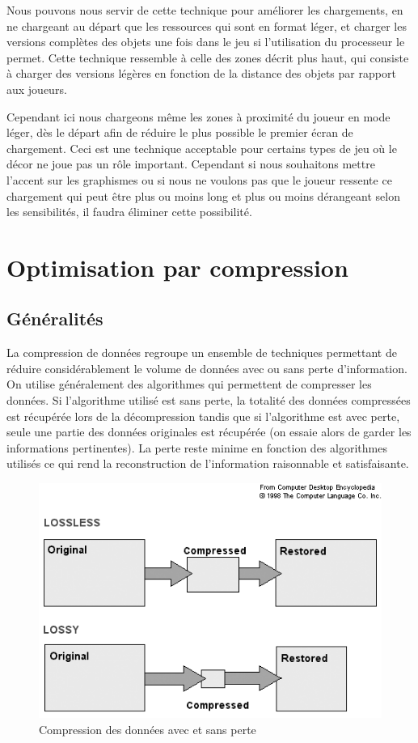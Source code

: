 \documentclass[a4paper, 11pt]{article} %
\begin{document}
Nous pouvons nous servir de cette technique pour améliorer les chargements, en ne chargeant au départ que les ressources qui sont en format léger, et charger les versions complètes des objets une fois dans le jeu si l'utilisation du processeur le permet. Cette technique ressemble à celle des zones décrit plus haut, qui consiste à charger des versions légères en fonction de la distance des objets par rapport aux joueurs.

Cependant ici nous chargeons même les zones à proximité du joueur en mode léger, dès le départ afin de réduire le plus possible le premier écran de chargement. Ceci est une technique acceptable pour certains types de jeu où le décor ne joue pas un rôle important. Cependant si nous souhaitons mettre l'accent sur les graphismes ou si nous ne voulons pas que le joueur ressente ce chargement qui peut être plus ou moins long et plus ou moins dérangeant selon les sensibilités, il faudra éliminer cette possibilité.

\newpage
\section{Optimisation par compression}
\subsection{Généralités}
La compression de données regroupe un ensemble de techniques permettant de réduire considérablement le volume de données avec ou sans perte d'information. On utilise généralement des algorithmes qui permettent de compresser les données. Si l'algorithme utilisé est sans perte, la totalité des données compressées est récupérée lors de la décompression tandis que si l'algorithme est avec perte, seule une partie des données originales est récupérée (on essaie alors de garder les informations pertinentes). La perte reste minime en fonction des algorithmes utilisés ce qui rend la reconstruction de l'information raisonnable et satisfaisante. 

\begin{figure}[!h]%
\includegraphics[width=\columnwidth]{images/data_compression.png}%
\caption{Compression des données avec et sans perte}%
\label{}%
\end{figure}
\end{document}
